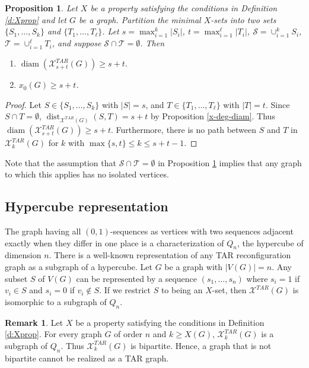 \documentclass{article}
\def\red{\color{red}}
\numberwithin{figure}{section}   %
\newtheorem{prop}[thm]{Proposition}
\theoremstyle{definition}
\newtheorem{rem}[thm]{Remark}
\theoremstyle{definition}
\theoremstyle{definition}
\newcommand{\ben}{\begin{enumerate}}
\newcommand{\een}{\end{enumerate}}
\newcommand{\bpf}{\begin{proof}}
\newcommand{\epf}{\end{proof}\ms}
\newcommand{\ms}{\medskip}
\newcommand{\dist}{\operatorname{dist}}
\newcommand{\diam}{\operatorname{diam}}
\newcommand{\mcs}{\mathcal{S}}
\newcommand{\mct}{\mathcal{T}}
\newcommand{\xtar}{\mathscr{X}^{TAR}}
\begin{document}
\begin{prop}\label{p:disj-min-sets}
Let $X$ be a property satisfying the conditions in Definition \ref{d:Xprop} and let  $G$ be a graph. Partition the minimal $X$-sets  into two sets $\{S_1,\dots,S_k\}$ and $\{T_1,\dots,T_\ell\}$.   Let $s=\max_{i=1}^k|S_i|$, $t=\max_{i=1}^\ell|T_i|$, %
$\mcs=\cup _{i=1}^k S_i$,    $\mct=\cup _{i=1}^\ell T_i$, and suppose $\mcs\cap\mct=\emptyset$. Then 
\ben
\item $\diam(\xtar_{s+t}(G))\ge s+t$.
\item $x_0(G)\ge s+t$.
\een
\end{prop}
\bpf 
Let $S \in \{S_1,\dots,S_k\}$ with $|S|=s$, and $T \in \{T_1,\dots,T_\ell\}$ with $|T|=t$.   Since $S\cap T=\emptyset$,  $\dist_{\xtar(G)}(S,T)=s+t$ %
by Proposition \ref{x-deg-diam}.  
Thus $\diam(\xtar_{s+t}(G))\ge s+t$.  Furthermore, there is no path between $S$ and $T$ in $\xtar_k(G)$ for $k$ with $\max\{s,t\}\le k\le s+t-1$.
\epf

Note that the assumption that $\mcs\cap\mct=\emptyset$ in Proposition \ref{p:disj-min-sets} implies that any graph to which this applies has no isolated vertices. %


\subsection{Hypercube representation}

 The graph having all  $(0,1)$-sequences as vertices with two sequences adjacent exactly when they differ in one place is a characterization of $Q_n$, the hypercube of dimension $n$. There is a well-known representation of any TAR reconfiguration graph as a subgraph of a hypercube.  Let $G$ be a graph with $|V(G)|=n$. Any subset $S$ of $V(G)$ can be represented by a sequence $(s_1, \dots, s_n)$ where $s_i=1$ if $v_i\in S$ and $s_i=0$ if $v_i\not\in S$.    
If we restrict  $S$ to being an $X$-set,  then $\xtar(G)$ is isomorphic to a subgraph of $Q_n$.  

\begin{rem}\label{r:hypercube-bip} Let $X$ be a property satisfying the conditions in Definition \ref{d:Xprop}. For every graph $G$  of order $n$ and $k\ge X(G)$, $\xtar_k (G)$ is a subgraph of $Q_n$.  Thus $\xtar_k (G)$  is bipartite. Hence, a graph that is not bipartite cannot be realized as a TAR graph.
\end{rem}
\end{document}
